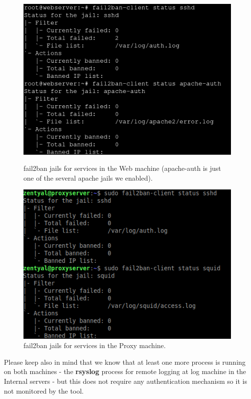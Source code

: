 \begin{figure}[!htb]
\centering
\begin{minipage}{.5\textwidth}
  \centering
  \includegraphics[width=1\textwidth]{fail2banWeb.png}
  \caption[a]{fail2ban jails for services in the Web machine (apache-auth is just one of the several apache jails we enabled).}\label{fig:7}
\end{minipage}%
\begin{minipage}{.5\textwidth}
  \centering
  \includegraphics[width=1\textwidth]{fail2banProxy.png}
  \caption[a]{fail2ban jails for services in the Proxy machine.}\label{fig:7}
\end{minipage}%
\end{figure}

Please keep also in mind that we know that at least one more process is running on both machines - the \textbf{rsyslog} process for remote logging at log machine in the Internal servers - but this does not require any authentication mechanism so it is not monitored by the tool.
